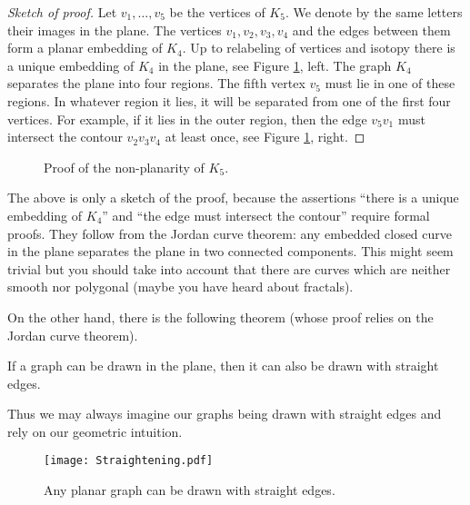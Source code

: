 \begin{page}

\begin{proof}[Sketch of proof]
Let $v_1, \ldots, v_5$ be the vertices of $K_5$.
We denote by the same letters their images in the plane.
The vertices $v_1, v_2, v_3, v_4$ and the edges between them form a planar embedding of $K_4$.
Up to relabeling of vertices and isotopy there is a unique embedding of $K_4$ in the plane, see Figure \ref{fig:K4Embedding}, left.
The graph $K_4$ separates the plane into four regions.
The fifth vertex $v_5$ must lie in one of these regions.
In whatever region it lies, it will be separated from one of the first four vertices.
For example, if it lies in the outer region,
then the edge $v_5v_1$ must intersect the contour $v_2v_3v_4$ at least once, see Figure \ref{fig:K4Embedding}, right.
\end{proof}

\begin{figure}[ht]
\begin{center}

\end{center}
\caption{Proof of the non-planarity of $K_5$.}
\label{fig:K4Embedding}
\end{figure}

The above is only a sketch of the proof, because the assertions
``there is a unique embedding of $K_4$'' and ``the edge must intersect the contour'' require formal proofs.
They follow from the Jordan curve theorem: any embedded closed curve in the plane separates the plane in two connected components.
This might seem trivial but you should take into account that there are curves which are neither smooth nor polygonal
(maybe you have heard about fractals).

On the other hand, there is the following theorem (whose proof relies on the Jordan curve theorem).

\end{page}

\begin{page}

\begin{thm}[F\'ary]
If a graph can be drawn in the plane, then it can also be drawn with straight edges.
\end{thm}

\end{page}

\begin{page}

Thus we may always imagine our graphs being drawn with straight edges and rely on our geometric intuition.

\begin{figure}[ht]
\begin{center}
\texttt{[image: Straightening.pdf]}
\end{center}
\caption{Any planar graph can be drawn with straight edges.}
\label{fig:Straightening}
\end{figure}



\end{page}

